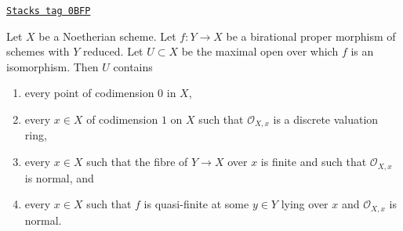 \begin{lemma}
\label{varieties-lemma-modification-normal-iso-over-codimension-1}
\href{https://stacks.math.columbia.edu/tag/0BFP}{\texttt{Stacks tag 0BFP}}

Let $X$ be a Noetherian scheme. Let $f : Y \to X$ be a birational proper
morphism of schemes with $Y$ reduced. Let $U \subset X$ be the
maximal open over which $f$ is an isomorphism. Then $U$ contains
\begin{enumerate}
\item every point of codimension $0$ in $X$,
\item every $x \in X$ of codimension $1$ on $X$ such that
$\mathcal{O}_{X, x}$ is a discrete valuation ring,
\item every $x \in X$ such that the fibre of $Y \to X$ over $x$ is
finite and such that $\mathcal{O}_{X, x}$ is normal, and
\item every $x \in X$ such that $f$ is quasi-finite at some
$y \in Y$ lying over $x$ and $\mathcal{O}_{X, x}$ is normal.
\end{enumerate}
\end{lemma}

